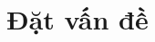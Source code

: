 \documentclass[../DoAn.tex]{subfiles}
\begin{document}





\section{Đặt vấn đề}
\label{section:1.1}

\end{document}
